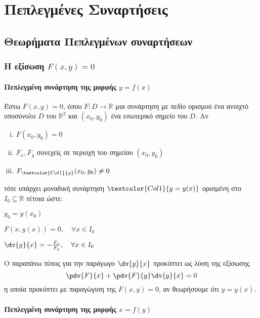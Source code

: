 \chapter{Πεπλεγμένες Συναρτήσεις}


\section{Θεωρήματα Πεπλεγμένων συναρτήσεων}

\vspace{\baselineskip}

\subsection{Η εξίσωση \ensuremath{F(x,y) = 0}}

\subsubsection{Πεπλεγμένη συνάρτηση της μορφής \ensuremath{y=f(x)}}

Έστω $ F(x,y) = 0 $, όπου $ F\colon D \to \mathbb{R} $ μια συνάρτηση με πεδίο
ορισμού ένα ανοιχτό υποσύνολο $D$ του $\mathbb{R}^{2}$ και $ (x_0,y_0) $ ένα 
εσωτερικό σημείο του $D$.  Αν 
\begin{enumerate}[(i)]
  \item $F(x_0,y_0) = 0$ 
  \item $ F_x, F_y$ συνεχείς σε περιοχή του σημείου $ (x_0,y_0) $ 
  \item $ F_{\textcolor{Col1}{y}}(x_0,y_0) \neq 0 $
\end{enumerate}
τότε υπάρχει μοναδική συνάρτηση $\textcolor{Col1}{y=y(x)} $ ορισμένη στο 
$ I_0 \subseteq \mathbb{R} $ τέτοια ώστε:
\begin{myitemize}
  \item $y_0 = y(x_0)$
  \item $F(x,y(x)) = 0, \quad \forall x \in I_0$
  \item $ \dv{y}{x} = - \frac{F_x}{F_y}, \quad \forall x \in I_0  $
\end{myitemize}

\begin{rem}
  Ο παραπάνω τύπος για την παράγωγο $ \dv{y}{x} $ προκύπτει ως λύση της εξίσωσης
  \[
    \pdv{F}{x} + \pdv{F}{y}\dv{y}{x} = 0 
  \] 
  η οποία προκύπτει με παραγώγιση της $ F(x,y) = 0$, αν θεωρήσουμε ότι $ y=y(x) $.
\end{rem}

\subsubsection{Πεπλεγμένη συνάρτηση της μορφής \ensuremath{x=f(y)}}

